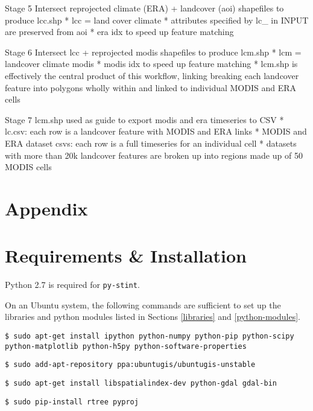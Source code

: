 \documentclass[twoside,a4paper]{refart}
\begin{document}
      Stage 5
        Intersect reprojected climate (ERA) + landcover (aoi) shapefiles
        to produce lcc.shp
          * lcc = land cover climate
          * attributes specified by lc\_ in INPUT are preserved from aoi
          * era idx to speed up feature matching

      Stage 6
        Intersect lcc + reprojected modis shapefiles to produce lcm.shp
        * lcm = landcover climate modis
        * modis idx to speed up feature matching
        * lcm.shp is effectively the central product of this workflow, linking
          breaking each landcover feature into polygons wholly within and
          linked to individual MODIS and ERA cells

      Stage 7
        lcm.shp used as guide to export modis and era timeseries to CSV
        * lc.csv: each row is a landcover feature with MODIS and ERA links
        * MODIS and ERA dataset csvs: each row is a full timeseries for an
          individual cell
        * datasets with more than 20k landcover features are broken up into
          regions made up of 50 MODIS cells


\clearpage
\section*{Appendix}
\appendix
\section{Requirements \& Installation}
\label{setup}

Python 2.7 is required for \texttt{py-stint}.

On an Ubuntu system, the following commands are sufficient to set up the libraries and python modules listed in Sections \ref{libraries} and \ref{python-modules}.

\texttt{\$ sudo apt-get install ipython python-numpy python-pip python-scipy python-matplotlib python-h5py python-software-properties}

\texttt{\$ sudo add-apt-repository ppa:ubuntugis/ubuntugis-unstable}

\texttt{\$ sudo apt-get install libspatialindex-dev python-gdal gdal-bin}

\texttt{\$ sudo pip-install rtree pyproj}
\end{document}
